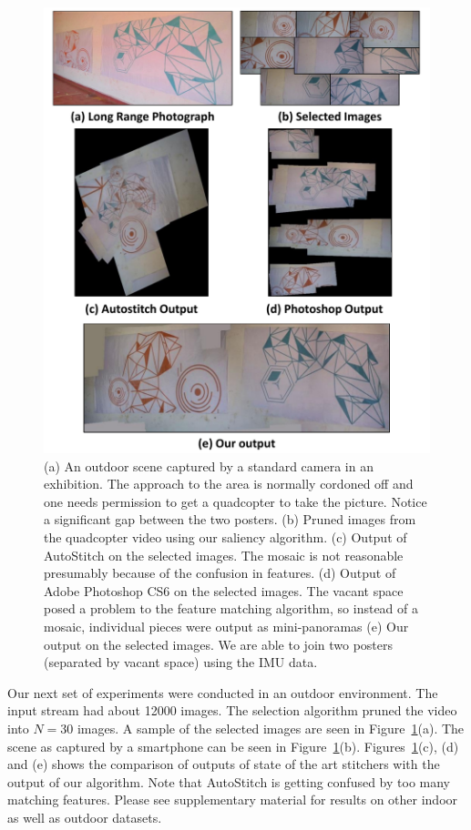 \begin{figure}[h!]
\centering
\includegraphics[width=\linewidth]{figures/vacantSpaces/orange_blue}
\caption[Result: Outdoor Exhibition]{(a) An outdoor scene captured by a standard
camera in an exhibition. The approach to the area is normally cordoned off and one
  needs permission to get a quadcopter to take the picture.  Notice a
  significant gap between the two posters.  (b) Pruned images from the
  quadcopter video using our saliency algorithm. (c) Output of
  AutoStitch on the selected images. The mosaic is not reasonable
  presumably because of the confusion in features. (d) Output of Adobe
  Photoshop CS6 on the selected images. The vacant space posed a
  problem to the feature matching algorithm, so instead of a mosaic,
  individual pieces were output as mini-panoramas (e) Our output on
  the selected images. We are able to join two posters (separated by
  vacant space) using the IMU data.}
\label{fig:results}
\end{figure}

Our next set of experiments were conducted in an outdoor
environment. The input stream had about 12000 images. The selection
algorithm pruned the video into $N=30$ images. A sample of the
selected images are seen in Figure~\ref{fig:results}(a).  The scene as
captured by a smartphone can be seen in Figure~\ref{fig:results}(b).
Figures~\ref{fig:results}(c), (d) and (e) shows the comparison of outputs of
state of the art stitchers with the output of our algorithm. Note that
AutoStitch is getting confused by too many matching features. 
Please see supplementary material for results on other indoor as well as outdoor datasets.

